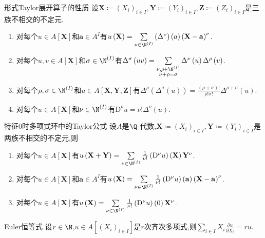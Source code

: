 \begin{proposition}{形式Taylor展开算子的性质}{}
	设$\mathbf{X}\coloneq(X_{i})_{i\in I},\mathbf{Y}\coloneq\left(Y_{i}\right)_{i\in I},\mathbf{Z}\coloneq\left(Z_{i}\right)_{i\in I}$是三族不相交的不定元.
	\begin{enumerate}
		\item 对每个$u\in A[\mathbf{X}]$和$\mathbf{a}\in A^{I}$有$u\left(\mathbf{X}\right)=\sum\limits_{\nu\in\N^{\left(I\right)}}\left(\Delta^{\nu}\right)\left(a\right)\left(\mathbf{X}-\mathbf{a}\right)^{\nu}$.
		\item 对每个$u,v\in A[\mathbf{X}]$和$\sigma\in\N^{\left(I\right)}$有$\Delta^{\sigma}\left(uv\right)=\sum\limits_{\substack{\nu,\rho\in\N^{\left(I\right)}\\ \nu+\rho=\sigma}}\Delta^{\nu}\left(u\right)\Delta^{\rho}\left(v\right)$.
		\item 对每个$\rho,\sigma\in\N^{\left(I\right)}$和$u\in A[\mathbf{X},\mathbf{Y},\mathbf{Z}]$有$\Delta^{\rho}\left(\Delta^{\sigma}\left(u\right)\right)=\frac{\left(\rho+\sigma\right)!}{\rho!\sigma!}\Delta^{\rho+\sigma}\left(u\right)$.
		\item 对每个$u\in A[\mathbf{X}]$和$\nu\in\N^{\left(I\right)}$有$\mathrm{D}^{\nu}u=\nu!\Delta^{\nu}\left(u\right)$.
	\end{enumerate}
\end{proposition}

\begin{corollary}{特征$0$时多项式环中的Taylor公式}{}
	设$A$是$\Q$-代数,$\mathbf{X}\coloneq(X_{i})_{i\in I},\mathbf{Y}\coloneq\left(Y_{i}\right)_{i\in I}$是两族不相交的不定元,则
	\begin{enumerate}
		\item 对每个$u\in A[\mathbf{X}]$有$u\left(\mathbf{X}+\mathbf{Y}\right)=\sum\limits_{\nu\in\N^{\left(I\right)}}\frac{1}{\nu!}\left(\mathrm{D}^{\nu}u\right)\left(\mathbf{X}\right)\mathbf{Y}^{\nu}$.
		\item 对每个$u\in A[\mathbf{X}]$和$\mathbf{a}\in A^{I}$有$u\left(\mathbf{X}\right)=\sum\limits_{\nu\in\N^{\left(I\right)}}\frac{1}{\nu!}\left(\mathrm{D}^{\nu}u\right)\left(\mathbf{a}\right)\left(\mathbf{X}-\mathbf{a}\right)^{\nu}$.
		\item 对每个$u\in A[\mathbf{X}]$有$u\left(\mathbf{X}\right)=\sum\limits_{\nu\in\N^{\left(I\right)}}\frac{1}{\nu!}\left(\mathrm{D}^{\nu}u\right)\left(0\right)\mathbf{X}^{\nu}$.
	\end{enumerate}
\end{corollary}

\begin{proposition}{Euler恒等式}{}
	设$r\in\N$,$u\in A[(X_{i})_{i\in I}]$是$r$次齐次多项式,则$\sum\limits_{i\in I}X_{i}\frac{\partial u}{\partial X_{i}}=ru$.
\end{proposition}











